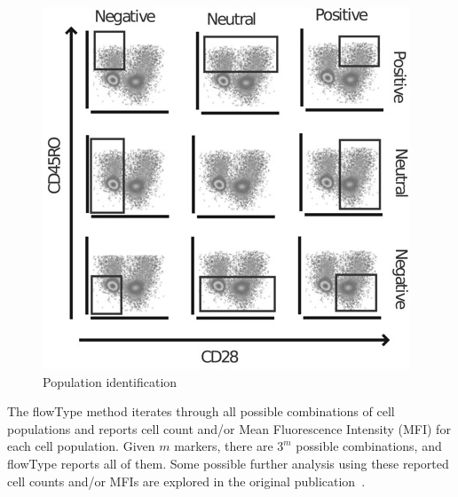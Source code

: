 \begin{figure}[!ht]
  \centering
  \includegraphics[width=.6\textwidth]{figs/flowtype/pops}
  \caption{Population identification}
  \label{fig:flowtype-pops}
\end{figure}

The flowType method iterates through all possible combinations of cell populations and reports cell count and/or Mean Fluorescence Intensity (MFI) for each cell population. Given $m$ markers, there are $3^m$ possible combinations, and flowType reports all of them. Some possible further analysis using these reported cell counts and/or MFIs are explored in the original publication~\cite{Aghaeepour2012}.


